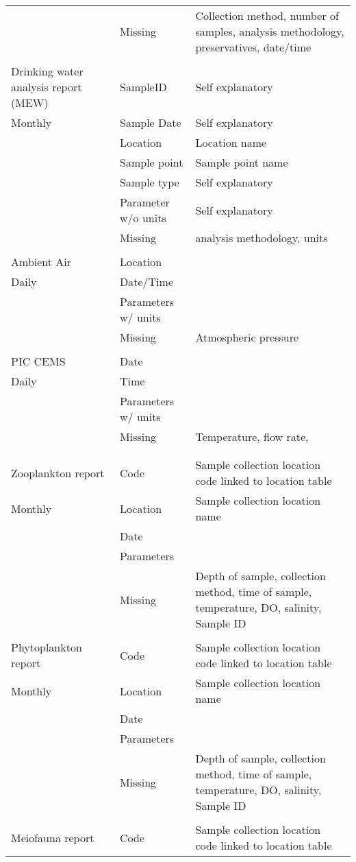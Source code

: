 \begin{table}[H]
{\begin{tabular}{@{}lll@{}}
 & Missing & Collection method, number of samples, analysis methodology, preservatives, date/time \\
 &  &  \\
Drinking water analysis report (MEW) & SampleID & Self explanatory \\
Monthly & Sample Date & Self explanatory \\
 & Location & Location name \\
 & Sample point & Sample point name \\
 & Sample type & Self explanatory \\
 & Parameter w/o units & Self explanatory \\
 & Missing & analysis methodology, units \\
 &  &  \\
Ambient Air & Location &  \\
Daily & Date/Time &  \\
 & Parameters w/ units &  \\
 & Missing & Atmospheric pressure \\
 &  &  \\
PIC CEMS & Date &  \\
Daily & Time &  \\
 & Parameters w/ units &  \\
 & Missing & Temperature, flow rate, \\
 &  &  \\
 &  &  \\
Zooplankton report & Code & Sample collection location code linked to location table \\
Monthly & Location & Sample collection location name \\
 & Date &  \\
 & Parameters &  \\
 & Missing & Depth of sample, collection method, time of sample, temperature, DO, salinity, Sample ID \\
 &  &  \\
Phytoplankton report & Code & Sample collection location code linked to location table \\
Monthly & Location & Sample collection location name \\
 & Date &  \\
 & Parameters &  \\
 & Missing & Depth of sample, collection method, time of sample, temperature, DO, salinity, Sample ID \\
 &  &  \\
Meiofauna report & Code & Sample collection location code linked to location table \\

\end{tabular}}
\end{table}
